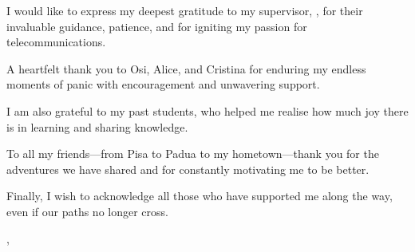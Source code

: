 \begin{flushleft}
\itshape

I would like to express my deepest gratitude to my supervisor, \firstSupervisorTitle{} \firstSupervisorFullName{}, for their invaluable guidance, patience, and for igniting my passion for telecommunications.

\vspace{12pt}

A heartfelt thank you to Osi, Alice, and Cristina for enduring my endless moments of panic with encouragement and unwavering support.

\vspace{12pt}

I am also grateful to my past students, who helped me realise how much joy there is in learning and sharing knowledge.

\vspace{12pt}

To all my friends—from Pisa to Padua to my hometown—thank you for the adventures we have shared and for constantly motivating me to be better.

\vspace{12pt}

Finally, I wish to acknowledge all those who have supported me along the way, even if our paths no longer cross.

\vspace{24pt}

\noindent
\myLocation, \myTime
\hfill
\documentAuthor{}

\end{flushleft}
\endgroup